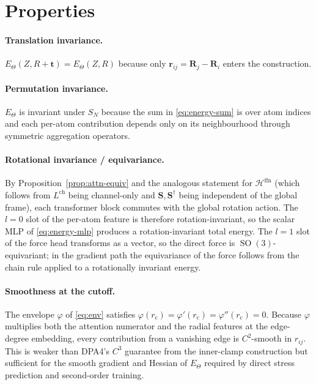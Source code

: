 \documentclass[11pt,a4paper]{article}
\DeclareMathOperator{\SO}{SO}
\newcommand{\bR}{\bm{R}}
\newcommand{\br}{\bm{r}}
\newcommand{\rcut}{r_{\mathrm{c}}}
\newcommand{\Hb}{\mathcal{H}}
\theoremstyle{plain}
\theoremstyle{definition}
\theoremstyle{remark}
\begin{document}
\section{Properties}\label{sec:props}

\paragraph{Translation invariance.}
$E_\Theta(Z,R+\bm{t})=E_\Theta(Z,R)$ because only $\br_{ij}=\bR_j-\bR_i$ enters the construction.

\paragraph{Permutation invariance.}
$E_\Theta$ is invariant under $S_N$ because the sum in \eqref{eq:energy-sum} is over atom indices and each per-atom contribution depends only on its neighbourhood through symmetric aggregation operators.

\paragraph{Rotational invariance / equivariance.}
By Proposition~\ref{prop:attn-equiv} and the analogous statement for
$\Hb^{\mathrm{ffn}}$ (which follows from $L^{\mathrm{ch}}$ being channel-only
and $\bm{S},\bm{S}^{\dagger}$ being independent of the global frame), each
transformer block commutes with the global rotation action. The $l=0$ slot of
the per-atom feature is therefore rotation-invariant, so the scalar MLP of
\eqref{eq:energy-mlp} produces a rotation-invariant total energy. The $l=1$
slot of the force head transforms as a vector, so the direct force is
$\SO(3)$-equivariant; in the gradient path the equivariance of the force
follows from the chain rule applied to a rotationally invariant energy.

\paragraph{Smoothness at the cutoff.}
The envelope $\varphi$ of \eqref{eq:env} satisfies
$\varphi(\rcut)=\varphi'(\rcut)=\varphi''(\rcut)=0$. Because $\varphi$
multiplies both the attention numerator and the radial features at the
edge-degree embedding, every contribution from a vanishing edge is $C^2$-smooth
in $r_{ij}$. This is weaker than DPA4's $C^3$ guarantee from the inner-clamp
construction but sufficient for the smooth gradient and Hessian of $E_\Theta$
required by direct stress prediction and second-order training.
\end{document}
